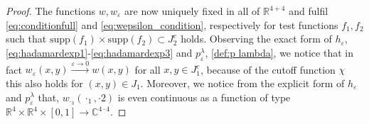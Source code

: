 \documentclass[a4paper,11pt]{article}
\begin{document}
\begin{proof}
The functions \(w, w_\varepsilon\) are now uniquely fixed in all of \(\mathbb{R}^{4+4}\) and fulfil  \eqref{eq:conditionfull} and \eqref{eq:wepsilon_condition}, respectively
for test functions \(f_1,f_2\) such that \(\mathrm{supp}(f_1)\times \mathrm{supp}(f_2) \subset J_2^c\) holds. Observing the exact form of 
\(h_\varepsilon\), \eqref{eq:hadamardexp1}-\eqref{eq:hadamardexp3} and \(p_\varepsilon^{\lambda}\), \eqref{def:p lambda}, we notice that in fact 
\(w_{\varepsilon}(x,y) \xrightarrow{\varepsilon\rightarrow 0} w(x,y)\) for all \(x,y\in J_1^c\), because of the cutoff function \(\chi\) this also holds for \((x,y)\in J_1\). 
Moreover, we notice from the explicit form of \(h_\varepsilon\) and \(p_\varepsilon^{\lambda}\) that,
\(w_{\cdot_3}(\cdot_1,\cdot2)\) is even continuous as a function of type \(\mathbb{R}^4\times\mathbb{R}^4\times[0,1]\rightarrow \mathbb{C}^{4\cdot 4}\).
\end{proof}
\end{document}
